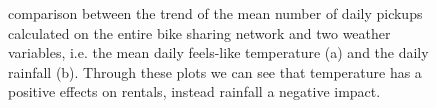 \begin{figure}[h!]
	\centering
	\quad
	\quad
	\caption{comparison between the trend of the mean number of daily pickups calculated on the entire bike sharing network and two weather variables, i.e. the mean daily feels-like temperature (a) and the daily rainfall (b). Through these plots we can see that temperature has a positive effects on rentals, instead rainfall a negative impact.}
\end{figure}

